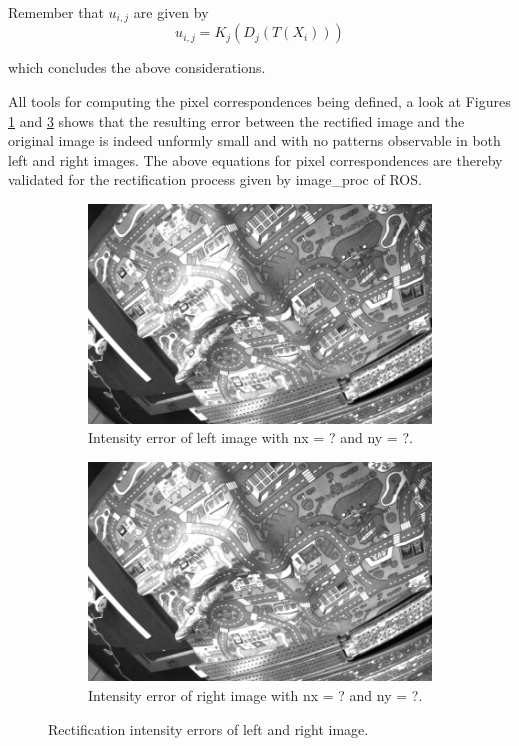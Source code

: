 Remember that $u_{i,j}$ are given by 
\begin{equation}
  u_{i,j} = K_j (D_j(T(X_i)))
  \label{eqn/rect/u_def}
\end{equation}

which concludes the above considerations.

All tools for computing the pixel correspondences being defined, a look at 
Figures \ref{fig:rect_r1} and \ref{fig:rect_r2} shows that the resulting error
between the rectified image and the original image is indeed unformly 
small and with no patterns observable in both left and right images.
The above equations for pixel correspondences are thereby validated for the 
rectification process given by image\_proc of ROS.

\begin{figure}[h]
  \centering
  \begin{subfigure}[b]{0.49\textwidth}
    \includegraphics[width=\textwidth]{figures/rect_r1.jpg} 
    \caption{Intensity error of left image with nx = ? and ny = ?.}
    \label{fig:rect_r1}
  \end{subfigure}
  \begin{subfigure}[b]{0.49\textwidth}
    \includegraphics[width=\textwidth]{figures/rect_r2.jpg} 
    \caption{Intensity error of right image with nx = ? and ny = ?.}
    \label{fig:rect_r2}
  \end{subfigure}
  \caption{Rectification intensity errors of left and right image.}
\end{figure}

